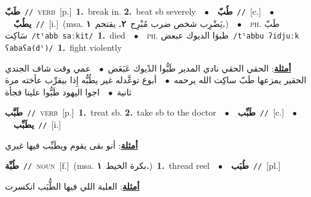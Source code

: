 \documentclass[10pt,a4paper,twoside]{article} %
\begin{document}
\begin{multicols}{2}
{\setlength\topsep{0pt}\textbf{\foreignlanguage{arabic}{طَبّ}}\ {\color{gray}\texttt{//}\color{black}}\ \textsc{verb}\ [p.]\ \textbf{1.}~break in.  \textbf{2.}~beat sb severely\ \ $\bullet$\ \ \setlength\topsep{0pt}\textbf{\foreignlanguage{arabic}{طُبّ}}\ {\color{gray}\texttt{//}\color{black}}\ [c.]\ \ $\bullet$\ \ \setlength\topsep{0pt}\textbf{\foreignlanguage{arabic}{يطُبّ}}\ {\color{gray}\texttt{//}\color{black}}\ [i.]\ \color{gray}(msa. \foreignlanguage{arabic}{يَضْرِب شخص ضرب مُبْرِح}~\foreignlanguage{arabic}{\textbf{٢.}}  \foreignlanguage{arabic}{يقتحم}~\foreignlanguage{arabic}{\textbf{١.}})\color{black}\ \ $\bullet$\ \ \textsc{ph.} \color{gray} \foreignlanguage{arabic}{طَبّ سَاكِت}\color{black}\ {\color{gray}\texttt{/{\sffamily tˤabb saːkit}/}\color{black}}\ \textbf{1.}~died\ \ $\bullet$\ \ \textsc{ph.} \color{gray} \foreignlanguage{arabic}{طبوَا الديوك عبعض}\color{black}\ {\color{gray}\texttt{/{\sffamily tˤabbu ʔidjuːk ʕabaʕa(dˤ)}/}\color{black}}\ \textbf{1.}~fight violently\  \begin{flushright}\color{gray}\foreignlanguage{arabic}{\textbf{\underline{\foreignlanguage{arabic}{أمثلة}}}: الحقي الحقي نادي المدير طَبُّوا الدْيوك عَبَعَض\ $\bullet$\ \  عمي وقت شاف الجندي الحقير يمزعها طَبّ ساكِت الله يرحمه\ $\bullet$\ \  أبوع توعَّدله غير يطُبُّه إِذا بيقرِّب عأخته مرة ثانية\ $\bullet$\ \  اجوا اليهود طَبُّوا علينا فجأة}\end{flushright}\color{black}} \vspace{2mm}

{\setlength\topsep{0pt}\textbf{\foreignlanguage{arabic}{طَبَّب}}\ {\color{gray}\texttt{//}\color{black}}\ \textsc{verb}\ [p.]\ \textbf{1.}~treat sb.  \textbf{2.}~take sb to the doctor\ \ $\bullet$\ \ \setlength\topsep{0pt}\textbf{\foreignlanguage{arabic}{طَبِّب}}\ {\color{gray}\texttt{//}\color{black}}\ [c.]\ \ $\bullet$\ \ \setlength\topsep{0pt}\textbf{\foreignlanguage{arabic}{يطَبِّب}}\ {\color{gray}\texttt{//}\color{black}}\ [i.]\  \begin{flushright}\color{gray}\foreignlanguage{arabic}{\textbf{\underline{\foreignlanguage{arabic}{أمثلة}}}: أنو بقى يقوم ويطَبِّب فيها غيري}\end{flushright}\color{black}} \vspace{2mm}

{\setlength\topsep{0pt}\textbf{\foreignlanguage{arabic}{طُبِّة}}\ {\color{gray}\texttt{//}\color{black}}\ \textsc{noun}\ [f.]\ \color{gray}(msa. \foreignlanguage{arabic}{بكرة الخيط}~\foreignlanguage{arabic}{\textbf{١.}})\color{black}\ \textbf{1.}~thread reel\ \ $\bullet$\ \ \setlength\topsep{0pt}\textbf{\foreignlanguage{arabic}{طُبَب}}\ {\color{gray}\texttt{//}\color{black}}\ [pl.]\  \begin{flushright}\color{gray}\foreignlanguage{arabic}{\textbf{\underline{\foreignlanguage{arabic}{أمثلة}}}: العلبة اللي فيها الطُّبَب انكسرت}\end{flushright}\color{black}} \vspace{2mm}


\end{multicols}
\end{document}
